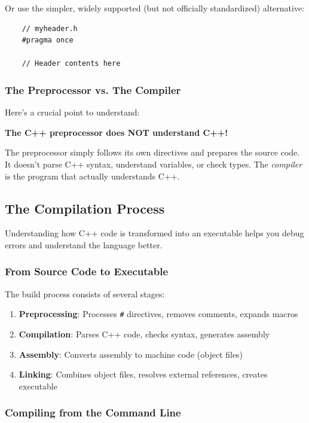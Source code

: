 Or use the simpler, widely supported (but not officially standardized) alternative:

\begin{lstlisting}
	// myheader.h
	#pragma once
	
	// Header contents here
\end{lstlisting}

\subsubsection{The Preprocessor vs. The Compiler}

Here's a crucial point to understand:

\begin{center}
	\textbf{The C++ preprocessor does NOT understand C++!}
\end{center}

The preprocessor simply follows its own directives and prepares the source code. It doesn't parse C++ syntax, understand variables, or check types. The \textit{compiler} is the program that actually understands C++.

\subsection{The Compilation Process}

Understanding how C++ code is transformed into an executable helps you debug errors and understand the language better.

\subsubsection{From Source Code to Executable}

The build process consists of several stages:

\begin{enumerate}
	\item \textbf{Preprocessing}: Processes \texttt{\#} directives, removes comments, expands macros
	\item \textbf{Compilation}: Parses C++ code, checks syntax, generates assembly
	\item \textbf{Assembly}: Converts assembly to machine code (object files)
	\item \textbf{Linking}: Combines object files, resolves external references, creates executable
\end{enumerate}

\subsubsection{Compiling from the Command Line}

